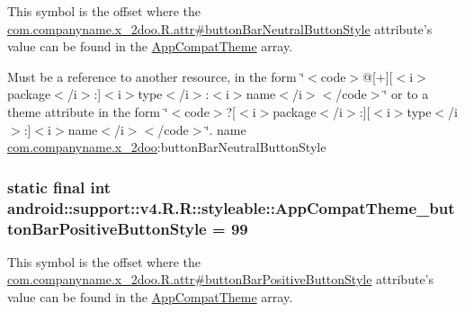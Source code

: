 This symbol is the offset where the \hyperlink{classcom_1_1companyname_1_1x__2doo_1_1_r_1_1attr_ad1d8b8ea4a7b468db52f301b3505a18}{com.companyname.x\_\-2doo.R.attr\#buttonBarNeutralButtonStyle} attribute's value can be found in the \hyperlink{classandroid_1_1support_1_1v4_1_1_r_1_1styleable_0873e92ba21076bb5a4aeadeb7f5779f}{AppCompatTheme} array.

Must be a reference to another resource, in the form \char`\"{}$<$code$>$@\mbox{[}+\mbox{]}\mbox{[}$<$i$>$package$<$/i$>$:\mbox{]}$<$i$>$type$<$/i$>$:$<$i$>$name$<$/i$>$$<$/code$>$\char`\"{} or to a theme attribute in the form \char`\"{}$<$code$>$?\mbox{[}$<$i$>$package$<$/i$>$:\mbox{]}\mbox{[}$<$i$>$type$<$/i$>$:\mbox{]}$<$i$>$name$<$/i$>$$<$/code$>$\char`\"{}.  name \hyperlink{namespacecom_1_1companyname_1_1x__2doo}{com.companyname.x\_\-2doo}:buttonBarNeutralButtonStyle \hypertarget{classandroid_1_1support_1_1v4_1_1_r_1_1styleable_794f00fd624776c9f0e4eac6e0dd1165}{
\subsubsection[{AppCompatTheme\_\-buttonBarPositiveButtonStyle}]{\setlength{\rightskip}{0pt plus 5cm}static final int android::support::v4.R.R::styleable::AppCompatTheme\_\-buttonBarPositiveButtonStyle = 99}}
\label{classandroid_1_1support_1_1v4_1_1_r_1_1styleable_794f00fd624776c9f0e4eac6e0dd1165}


This symbol is the offset where the \hyperlink{classcom_1_1companyname_1_1x__2doo_1_1_r_1_1attr_805bf14f1ef88f05c40b3ae123c240f4}{com.companyname.x\_\-2doo.R.attr\#buttonBarPositiveButtonStyle} attribute's value can be found in the \hyperlink{classandroid_1_1support_1_1v4_1_1_r_1_1styleable_0873e92ba21076bb5a4aeadeb7f5779f}{AppCompatTheme} array.

